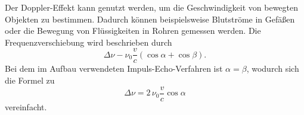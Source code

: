 Der Doppler-Effekt kann genutzt werden, um die Geschwindigkeit von bewegten Objekten zu bestimmen.
Dadurch können beispielsweise Blutströme in Gefäßen oder die Bewegung von Flüssigkeiten in Rohren gemessen werden.
Die Frequenzverschiebung wird beschrieben durch
\begin{equation*}
    Δν - ν_0 \frac{v}{c} \left(\cos{α} + \cos{β}\right).
\end{equation*}
Bei dem im Aufbau verwendeten Impuls-Echo-Verfahren ist $α = β$, wodurch sich die Formel zu 
\begin{equation}\label{eq:Frequenzverschiebung}
    Δν = 2\, ν_0 \frac{v}{c} \cos{α}
\end{equation}
vereinfacht.\\